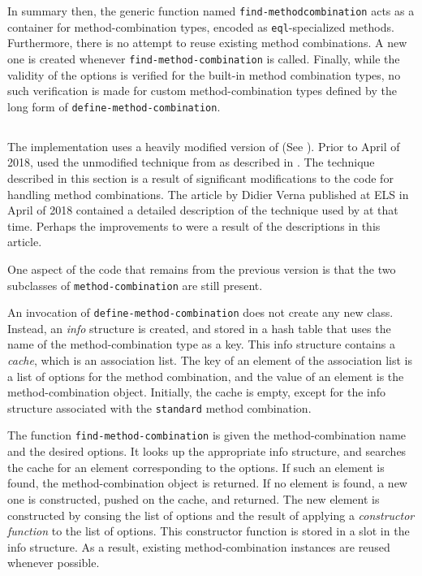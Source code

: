 In summary then, the generic function named \texttt{find-method\-combination}
acts as a container for method-combination types, encoded as
\texttt{eql}-specialized methods.  Furthermore, there is no attempt to
reuse existing method combinations.  A new one is created whenever
\texttt{find-method-combination} is called.  Finally, while the
validity of the options is verified for the built-in method
combination types, no such verification is made for custom
method-combination types defined by the long form of
\texttt{define-method-combination}.

\subsection{\sbcl{}}

The \sbcl{} \commonlisp{} implementation uses a heavily modified
version of \pcl{} (See ).  Prior to April of 2018,
\sbcl{} used the unmodified technique from \pcl{} as described in
.  The technique described in this section is a result
of significant modifications to the code for handling method
combinations.  The article by Didier Verna \cite{verna.18.els}
published at ELS in April of 2018 contained a detailed description of
the technique used by \sbcl{} at that time.  Perhaps the improvements
to \sbcl{} were a result of the descriptions in this article.

One aspect of the \sbcl{} code that remains from the previous version
is that the two subclasses of \texttt{method-combination} are still
present.

An invocation of \texttt{define-method-combination} does not create
any new class.  Instead, an \emph{info} structure is created, and
stored in a hash table that uses the name of the method-combination
type as a key.  This info structure contains a \emph{cache}, which is
an association list.  The key of an element of the association list is
a list of options for the method combination, and the value of an
element is the method-combination object.  Initially, the cache is
empty, except for the info structure associated with the
\texttt{standard} method combination.

The function \texttt{find-method-combination} is given the
method-combination name and the desired options.  It looks up the
appropriate info structure, and searches the cache for an element
corresponding to the options.  If such an element is found, the
method-combination object is returned.  If no element is found, a new
one is constructed, pushed on the cache, and returned.  The new
element is constructed by consing the list of options and the result
of applying a \emph{constructor function} to the list of options.
This constructor function is stored in a slot in the info structure.
As a result, existing method-combination instances are reused whenever
possible.

